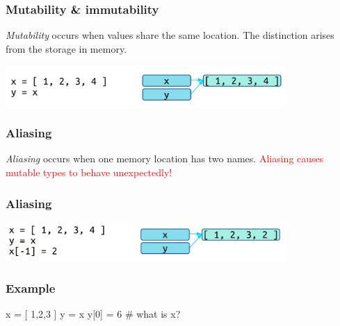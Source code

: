 \documentclass[11pt]{beamer}
\begin{document}
\begin{frame}[fragile]
  \frametitle{Mutability \& immutability}
  \Enlarge

  \begin{itemize}
  \myitem  \emph{Mutability} occurs when values share the same location. %
  \myitem  The distinction arises from the storage in memory.
  \end{itemize}
  \includegraphics[width=0.8\textwidth]{./img/memory-mutability.png}
\end{frame}

\begin{frame}[fragile]
  \frametitle{Aliasing}
  \Enlarge

  \begin{itemize}
  \myitem  \emph{Aliasing} occurs when one memory location has two names. %
  \myitem  \textcolor{red}{Aliasing causes mutable types to behave unexpectedly!}
  \end{itemize}
  \begin{semiverbatim}

  \end{semiverbatim}
\end{frame}

\begin{frame}[fragile]
  \frametitle{Aliasing}
  \Enlarge

  \includegraphics[width=0.8\textwidth]{./img/memory-aliasing.png}
\end{frame}

\begin{frame}[fragile]
  \frametitle{Example}
  \Enlarge

  \begin{semiverbatim}
x = [ 1,2,3 ]
y = x
y[0] = 6
# what is x?
  \end{semiverbatim}
\end{frame}
\end{document}
